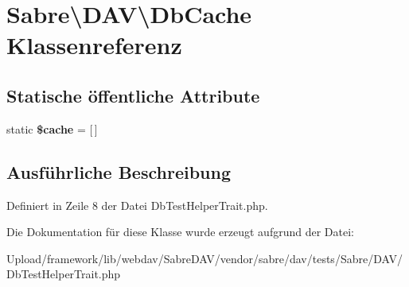 \hypertarget{class_sabre_1_1_d_a_v_1_1_db_cache}{}\section{Sabre\textbackslash{}D\+AV\textbackslash{}Db\+Cache Klassenreferenz}
\label{class_sabre_1_1_d_a_v_1_1_db_cache}
\subsection*{Statische öffentliche Attribute}
\begin{DoxyCompactItemize}
\item 
\mbox{\label{class_sabre_1_1_d_a_v_1_1_db_cache_aa2ccac5d11eef7da9aaa8b003cf48fbe}} 
static {\bfseries \$cache} = \mbox{[}$\,$\mbox{]}
\end{DoxyCompactItemize}


\subsection{Ausführliche Beschreibung}


Definiert in Zeile 8 der Datei Db\+Test\+Helper\+Trait.\+php.



Die Dokumentation für diese Klasse wurde erzeugt aufgrund der Datei\+:\begin{DoxyCompactItemize}
\item 
Upload/framework/lib/webdav/\+Sabre\+D\+A\+V/vendor/sabre/dav/tests/\+Sabre/\+D\+A\+V/Db\+Test\+Helper\+Trait.\+php\end{DoxyCompactItemize}
